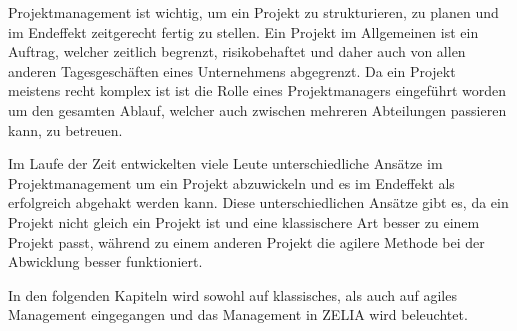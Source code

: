 
Projektmanagement ist wichtig, um ein Projekt zu strukturieren, zu planen und im Endeffekt zeitgerecht fertig zu stellen. Ein Projekt im Allgemeinen ist ein Auftrag, welcher zeitlich begrenzt, risikobehaftet und daher auch von allen anderen Tagesgeschäften eines Unternehmens abgegrenzt. Da ein Projekt meistens recht komplex ist ist die Rolle eines Projektmanagers eingeführt worden um den gesamten Ablauf, welcher auch zwischen mehreren Abteilungen passieren kann, zu betreuen. 

Im Laufe der Zeit entwickelten viele Leute unterschiedliche Ansätze im Projektmanagement um ein Projekt abzuwickeln und es im Endeffekt als erfolgreich abgehakt werden kann. Diese unterschiedlichen Ansätze gibt es, da ein Projekt nicht gleich ein Projekt ist und eine klassischere Art besser zu einem Projekt passt, während zu einem anderen Projekt die agilere Methode bei der Abwicklung besser funktioniert. 

In den folgenden Kapiteln wird sowohl auf klassisches, als auch auf agiles Management eingegangen und das Management in ZELIA wird beleuchtet. \cite{Projectman.}



